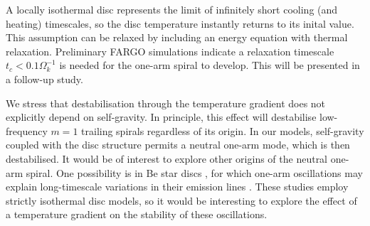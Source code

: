 A locally isothermal disc represents the limit of infinitely short
cooling (and heating) timescales, so the disc temperature instantly
returns to its inital value. %
This assumption can be relaxed by including an energy
equation with thermal relaxation. Preliminary FARGO simulations
indicate a relaxation timescale $t_c < 0.1\Omega_k^{-1}$ is needed for
the one-arm spiral to develop. This will be presented in a follow-up
study. %

We stress that destabilisation through the temperature gradient
does not explicitly depend on self-gravity. In principle, this effect
will destabilise low-frequency $m=1$ trailing spirals regardless of
its origin. In our models, self-gravity coupled with the disc
structure permits a neutral one-arm mode, which is then destabilised. 
It would be of interest to explore other origins of the neutral
one-arm spiral. One possibility is in Be star discs
\citep{rivinius13}, for which 
one-arm oscillations may explain long-timescale variations in their
emission lines \citep[see e.g.][and references
therein]{okasaki97,papaloizou06c,ogilvie08}. These studies employ
strictly isothermal disc models, so it would be interesting to explore
the effect of a temperature gradient on the stability of these
oscillations. 



